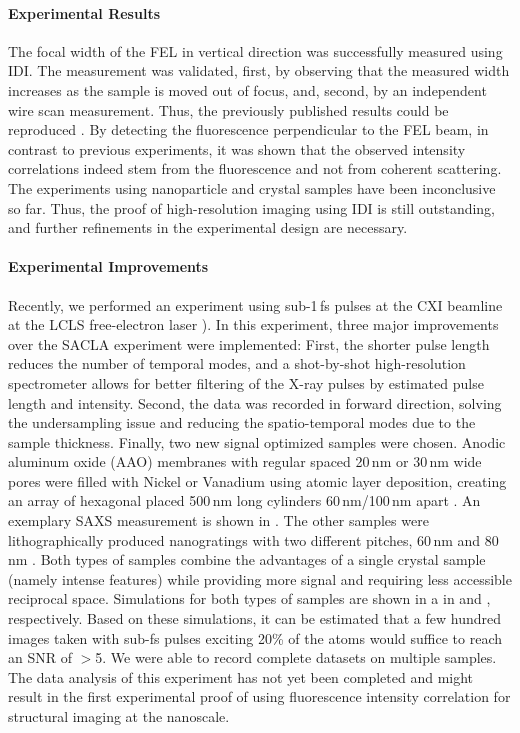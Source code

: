 \paragraph{Experimental Results}
The focal width of the FEL in vertical direction was successfully measured using IDI. The measurement was validated, first, by observing that the measured width increases as the sample is moved out of focus, and, second, by an independent wire scan measurement. Thus, the previously published results could be reproduced \cite{nakumura2020,inoue2019}. By detecting the fluorescence perpendicular to the FEL beam, in contrast to previous experiments, it was shown that the observed intensity correlations indeed stem from the fluorescence and not from coherent scattering.  The experiments using nanoparticle and crystal samples have been inconclusive so far. Thus, the proof of high-resolution imaging using IDI is still outstanding, and further refinements in the experimental design are necessary.


\paragraph{Experimental Improvements}
Recently, we performed an experiment using sub-1\,fs pulses at the CXI beamline at the LCLS free-electron laser \cite{subfs2017,argosecond}).
In this experiment, three major improvements over the SACLA experiment were implemented: First, the shorter pulse length reduces the number of temporal modes, and a shot-by-shot high-resolution spectrometer allows for better filtering of the X-ray pulses by estimated pulse length and intensity. Second, the data was recorded in forward direction, solving the undersampling issue and reducing the spatio-temporal modes due to the sample thickness. Finally, two new signal optimized samples were chosen. Anodic aluminum oxide (AAO) membranes with regular spaced 20\,nm or 30\,nm wide pores were filled with Nickel or Vanadium using atomic layer deposition, creating an array of hexagonal placed 500\,nm long cylinders 60\,nm/100\,nm apart \cite{carina2019}.  An exemplary SAXS measurement is shown in . The other samples were lithographically produced nanogratings with two different pitches, 60\,nm  and 80\,nm \cite{mojarad2015}. Both types of samples combine the advantages of a single crystal sample (namely intense features) while providing more signal and requiring less accessible reciprocal space.  Simulations for both types of samples are shown in a  in  and , respectively.
Based on these simulations, it can be estimated that a few hundred images taken with sub-fs pulses exciting 20\% of the atoms would suffice to reach an SNR of $>$5.
We were able to record complete datasets on multiple samples. The data analysis of this experiment has not yet been completed and might result in the first experimental proof of using fluorescence intensity correlation for structural imaging at the nanoscale.  


